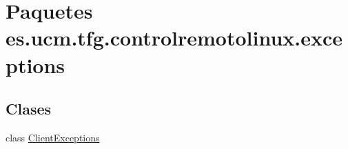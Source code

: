 \hypertarget{namespacees_1_1ucm_1_1tfg_1_1controlremotolinux_1_1exceptions}{\section{Paquetes es.\-ucm.\-tfg.\-controlremotolinux.\-exceptions}
\label{namespacees_1_1ucm_1_1tfg_1_1controlremotolinux_1_1exceptions}
}
\subsection*{Clases}
\begin{DoxyCompactItemize}
\item 
class \hyperlink{classes_1_1ucm_1_1tfg_1_1controlremotolinux_1_1exceptions_1_1ClientExceptions}{Client\-Exceptions}
\end{DoxyCompactItemize}
